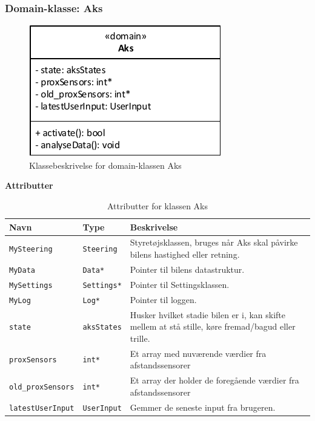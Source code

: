 \subsubsection{Domain-klasse: Aks}\label{sec:aks_design}

\begin{figure}[h]
\centering
\includegraphics[scale=1]{../fig/diagrammer/bil/cd_aks.pdf}
\caption{Klassebeskrivelse for domain-klassen Aks}
\label{fig:cd_aks}
\end{figure}

\textbf{Attributter}

\begin{table}[h]
\begin{tabularx}{\textwidth}{| Z | Z | L{9cm} |} \hline
Navn & Type & Beskrivelse \\\hline
\texttt{MySteering} & \texttt{Steering} & Styretøjsklassen, bruges når Aks skal påvirke bilens hastighed eller retning.\\\hline
\texttt{MyData} & \texttt{Data*} & Pointer til bilens datastruktur.\\\hline
\texttt{MySettings} & \texttt{Settings*} & Pointer til Settingsklassen. \\\hline
\texttt{MyLog} & \texttt{Log*} & Pointer til loggen. \\\hline
\texttt{state} & \texttt{aksStates} & Husker hvilket stadie bilen er i, kan skifte mellem at stå stille, køre fremad/bagud eller trille. \\\hline
\texttt{proxSensors} & \texttt{int*} & Et array med nuværende værdier fra afstandssensorer \\\hline
\texttt{old\_proxSensors} & \texttt{int*} & Et array der holder de foregående værdier fra afstandssensorer \\\hline
\texttt{latestUserInput} & \texttt{UserInput} & Gemmer de seneste input fra brugeren. \\ \hline
\end{tabularx}
\caption{Attributter for klassen Aks}
\label{table:attr_aks}
\end{table}


